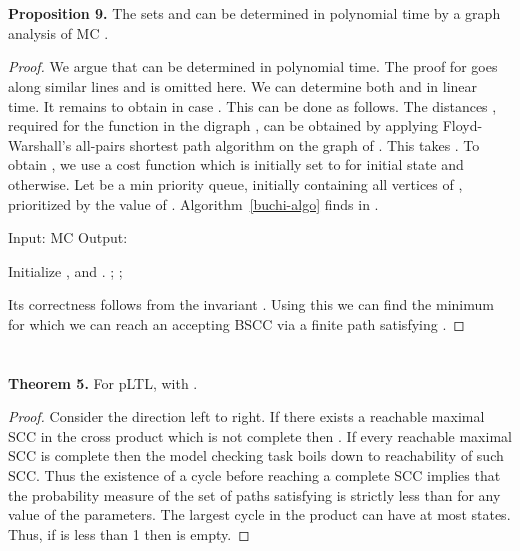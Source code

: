 \documentclass{llncs}
\begin{document}
\section{}
\textbf{Proposition 9.}
The sets  and  can be determined in polynomial time by a graph analysis of MC .
\begin{proof} 
We argue that  can be determined in polynomial time.
The proof for  goes along similar lines and is omitted here.
We can determine both  and  in linear time.
It remains to obtain  in case .
This can be done as follows.
The distances , required for the function  in the digraph , can be obtained by applying Floyd-Warshall's all-pairs shortest path algorithm on the graph of .
This takes .
To obtain , we use a cost function  which is initially set to  for initial state  and  otherwise.
Let   be a min priority queue, initially containing all vertices of , prioritized by the value of . Algorithm~\ref{buchi-algo} finds 
 in .
\begin{algorithm}
{\small
 \caption{Input: MC   Output: }\label{buchi-algo}
  \begin{algorithmic}[1]
    \State Initialize ,  and .
    \While{ }
      \State ;  ;
      \For{}  \EndFor
    \EndWhile
  \end{algorithmic}
}
\end{algorithm}
Its correctness follows from the invariant . 
Using this we can find the minimum  for which we can reach an accepting BSCC via a finite path satisfying . 
 \hfill 
\end{proof}

\section{}
\noindent
\textbf{Theorem 5.} 
For  pLTL,  with .
\begin{proof} Consider the direction left to right.
 If there exists a reachable maximal SCC  in the cross product  which is not complete then . If every reachable maximal SCC is complete then the model checking task boils down to 
 reachability of such SCC. Thus the existence of a cycle before reaching a complete SCC implies that the probability measure of the set of paths satisfying  is strictly less than  for any 
 value of the parameters. The largest cycle in the product can have at most  states. Thus, if  is less than 1 then  is empty.
 \hfill \end{proof}
 
\end{document}
